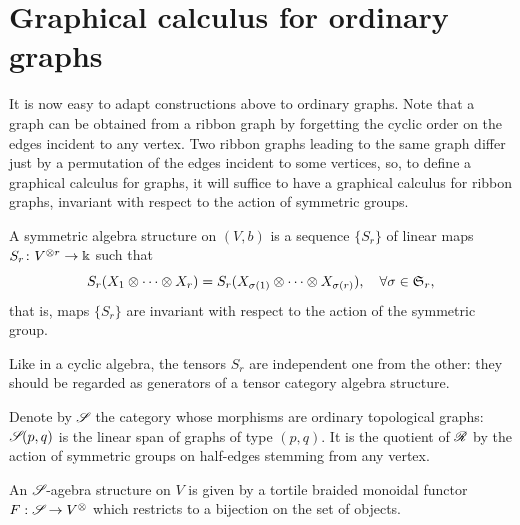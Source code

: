\section{Graphical calculus for ordinary graphs}
\label{sec:graph-calc-graphs}

It is now easy to adapt constructions above to ordinary graphs. 
Note that a graph can be obtained from a ribbon graph by forgetting
the cyclic order on the edges incident to any vertex. Two ribbon
graphs leading to the same graph differ just by a permutation of the
edges incident to some vertices, so, to define a graphical calculus
for graphs, it will suffice to have a graphical calculus for ribbon
graphs, invariant with respect to the action of symmetric groups.

\begin{definition}
  \label{dfn:symmetric-algebra}
  A symmetric algebra structure on $(V, b)$ is a sequence
  $\{S_r\}$ of linear maps $S_r \colon V\sp{\otimes r} \to \Bbbk$ such that
  \begin{equation*}
    S_r (X_1 \otimes \dots \otimes X_r) = S_r
    (X_{\sigma(1)} \otimes\dots \otimes X_{\sigma(r)}), 
    \quad \forall\sigma\in\mathfrak{S}_{r},
  \end{equation*}
  that is, maps $\{S_r\}$ are invariant with respect to the action of
  the symmetric group.
\end{definition}
Like in a cyclic algebra, the tensors $S_r$ are independent one from
the other: they should be regarded as generators of a tensor category
algebra structure.
\begin{definition}
  \label{dfn:symmetric-graph-category}
  Denote by $\mathscr{S}_{}$ the category whose morphisms are ordinary
  topological graphs: $\mathscr{S}_{}(p,q)$ is the linear span of graphs of type
  $(p,q)$. It is the quotient of $\mathscr{R}_{}$ by the action of symmetric
  groups on half-edges stemming from any vertex.
\end{definition}  
\begin{definition}
  \label{dfn:sg-algebra}
  An $\mathscr{S}_{}$-agebra structure on $V$ is given by a tortile braided
  monoidal functor $F:\mathscr{S}_{} \to V^{\otimes}$ which restricts to a
  bijection on the set of objects.
\end{definition}

